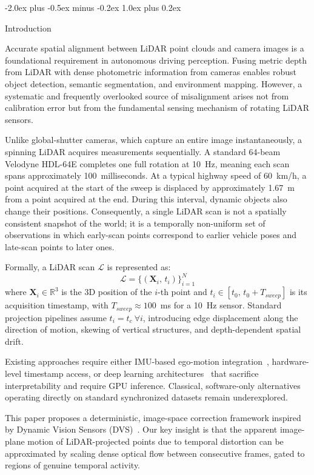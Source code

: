 \documentclass[conference]{IEEEtran}
\makeatletter
\def\section{\@startsection{section}{1}{\z@}
  {-2.0ex plus -0.5ex minus -0.2ex}
  {1.0ex plus 0.2ex}
  {\normalfont\large\bfseries\raggedright}}
\makeatother
\begin{document}
\section{Introduction}

Accurate spatial alignment between LiDAR point clouds and camera
images is a foundational requirement in autonomous driving
perception. Fusing metric depth from LiDAR with dense photometric
information from cameras enables robust object detection, semantic
segmentation, and environment mapping. However, a systematic and
frequently overlooked source of misalignment arises not from
calibration error but from the fundamental sensing mechanism of
rotating LiDAR sensors.

Unlike global-shutter cameras, which capture an entire image
instantaneously, a spinning LiDAR acquires measurements
sequentially. A standard 64-beam Velodyne HDL-64E completes one
full rotation at 10~Hz, meaning each scan spans approximately
100~milliseconds. At a typical highway speed of 60~km/h, a point
acquired at the start of the sweep is displaced by approximately
1.67~m from a point acquired at the end. During this interval,
dynamic objects also change their positions. Consequently, a single
LiDAR scan is not a spatially consistent snapshot of the world;
it is a temporally non-uniform set of observations in which
early-scan points correspond to earlier vehicle poses and late-scan
points to later ones.

Formally, a LiDAR scan $\mathcal{L}$ is represented as:
\begin{equation}
  \mathcal{L} = \{ (\mathbf{X}_i,\, t_i) \}_{i=1}^{N}
\end{equation}
where $\mathbf{X}_i \in \mathbb{R}^3$ is the 3D position of the
$i$-th point and $t_i \in [t_0,\, t_0 + T_{sweep}]$ is its
acquisition timestamp, with $T_{sweep} \approx 100$~ms for a
10~Hz sensor. Standard projection pipelines assume
$t_i = t_c\ \forall i$, introducing edge displacement along the
direction of motion, skewing of vertical structures, and
depth-dependent spatial drift.

Existing approaches require either IMU-based ego-motion
integration~\cite{kitti,zhang2014loam}, hardware-level timestamp
access, or deep learning architectures~\cite{delta2025,huang2021}
that sacrifice interpretability and require GPU inference. Classical,
software-only alternatives operating directly on standard
synchronized datasets remain underexplored.

This paper proposes a deterministic, image-space correction
framework inspired by Dynamic Vision Sensors
(DVS)~\cite{gallego2024}. Our key insight is that the apparent
image-plane motion of LiDAR-projected points due to temporal
distortion can be approximated by scaling dense optical flow
between consecutive frames, gated to regions of genuine temporal
activity.
\end{document}
